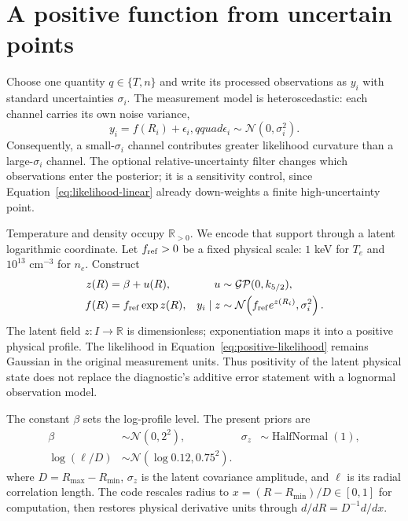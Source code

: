 \documentclass[10pt,twocolumn]{article}
\newcommand{\GP}{\mathcal{GP}}
\newcommand{\Normal}{\mathcal{N}}
\newcommand{\R}{\mathbb{R}}
\newcommand{\Te}{T_e}
\newcommand{\nelec}{n_e}
\begin{document}
\section{A positive function from uncertain points}

Choose one quantity $q\in\{T,n\}$ and write its processed observations as
$y_i$ with standard uncertainties $\sigma_i$.  The measurement model is
heteroscedastic: each channel carries its own noise variance,
\begin{equation}
y_i=f(R_i)+\epsilon_i,qquad
\epsilon_i\sim\Normal(0,\sigma_i^2).
\label{eq:likelihood-linear}
\end{equation}
Consequently, a small-$\sigma_i$ channel contributes greater likelihood
curvature than a large-$\sigma_i$ channel.  The optional relative-uncertainty
filter changes which observations enter the posterior; it is a sensitivity
control, since Equation~\eqref{eq:likelihood-linear} already down-weights a
finite high-uncertainty point.

Temperature and density occupy $\R_{>0}$.  We encode that support through a
latent logarithmic coordinate.  Let $f_{\rm ref}>0$ be a fixed physical scale:
$1$ keV for $\Te$ and $10^{13}$ cm$^{-3}$ for $\nelec$.  Construct
\begin{equation}
\begin{aligned}
z(R)&=\beta+u(R),&
u&\sim\GP(0,k_{5/2}),\\
f(R)&=f_{\rm ref}\exp z(R),&
y_i\mid z&\sim\Normal\!\left(f_{\rm ref}e^{z(R_i)},\sigma_i^2\right).
\end{aligned}
\label{eq:positive-likelihood}
\end{equation}
The latent field $z:I\rightarrow\R$ is dimensionless; exponentiation maps it
into a positive physical profile.  The likelihood in
Equation~\eqref{eq:positive-likelihood} remains Gaussian in the original
measurement units.  Thus positivity of the latent physical state does not
replace the diagnostic's additive error statement with a lognormal observation
model.

The constant $\beta$ sets the log-profile level.  The present priors are
\begin{equation}
\begin{aligned}
\beta&\sim\Normal(0,2^2),&
\sigma_z&\sim\operatorname{HalfNormal}(1),\\
\log(\ell/D)&\sim\Normal(\log0.12,0.75^2).&&
\end{aligned}
\label{eq:priors}
\end{equation}
where $D=R_{\max}-R_{\min}$, $\sigma_z$ is the latent covariance amplitude,
and $\ell$ is its radial correlation length.  The code rescales radius to
$x=(R-R_{\min})/D\in[0,1]$ for computation, then restores physical derivative
units through $d/dR=D^{-1}d/dx$.
\end{document}
